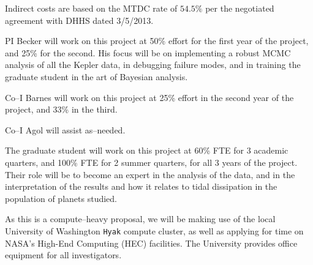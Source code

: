 Indirect costs are based on the MTDC rate of $54.5\%$ per the
negotiated agreement with DHHS dated 3/5/2013.

\pagebreak

\bigskip {}

PI Becker will work on this project at 50\% effort for the first
year of the project, and 25\% for the second.  His focus will be on
implementing a robust MCMC analysis of all the Kepler data, in
debugging failure modes, and in training the graduate student in the
art of Bayesian analysis.

Co--I Barnes will work on this project at 25\% effort in the second
year of the project, and 33\% in the third.

Co--I Agol will assist as--needed.

The graduate student will work on this project at 60\% FTE for 3
academic quarters, and 100\% FTE for 2 summer quarters, for all 3
years of the project. Their role will be to become an expert in the
analysis of the data, and in the interpretation of the results and how
it relates to tidal dissipation in the population of planets studied.

\bigskip {}

As this is a compute--heavy proposal, we will be making use of the
local University of Washington {\tt Hyak} compute cluster, as well as
applying for time on NASA's High-End Computing (HEC) facilities.  The
University provides office equipment for all investigators.
